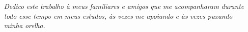 \newpage

\vspace*{22cm}

\hspace{8cm}\begin{minipage}{.60\textwidth}
            \textit{Dedico este trabalho à meus familiares e amigos que me acompanharam durante todo  esse tempo em meus estudos, às vezes   me apoiando e às vezes puxando minha orelha.}
            \end{minipage}
